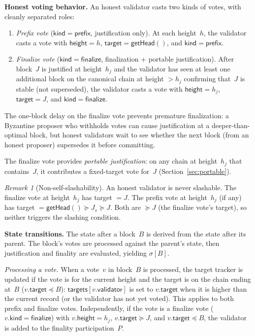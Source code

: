 \documentclass{article}
\renewcommand{\paragraph}[1]{\vspace{7pt}\noindent\textbf{#1}}
\newcommand{\target}{\mathsf{target}}
\newcommand{\targets}{\mathsf{targets}}
\newcommand{\kind}{\mathsf{kind}}
\newcommand{\height}{\mathsf{height}}
\newcommand{\finalize}{\mathsf{finalize}}
\newcommand{\validator}{\mathsf{validator}}
\newcommand{\prefix}{\mathsf{prefix}}
\theoremstyle{plain}
\theoremstyle{definition}
\theoremstyle{remark}
\newtheorem{remark}[theorem]{Remark}
\begin{document}
\paragraph{Honest voting behavior.}
An honest validator casts two kinds of votes, with cleanly separated roles:
\begin{enumerate}
  \item \emph{Prefix vote} ($\kind = \prefix$, justification only).
        At each height~$h$, the validator casts a vote with $\height = h$, $\target = \textsf{getHead}()$, and $\kind = \prefix$.
  \item \emph{Finalize vote} ($\kind = \finalize$, finalization + portable justification).
        After block~$J$ is justified at height~$h_j$ and the validator has seen at least one additional block on the canonical chain at height $> h_j$ confirming that~$J$ is stable (not superseded), the validator casts a vote with $\height = h_j$, $\target = J$, and $\kind = \finalize$.
\end{enumerate}
The one-block delay on the finalize vote prevents premature finalization: a Byzantine proposer who withholds votes can cause justification at a deeper-than-optimal block, but honest validators wait to see whether the next block (from an honest proposer) supersedes it before committing.

The finalize vote provides \emph{portable justification}: on any chain at height~$h_j$ that contains~$J$, it contributes a fixed-target vote for~$J$ (Section~\ref{sec:portable}).

\begin{remark}[Non-self-slashability]\label{rem:nonslash}
An honest validator is never slashable.
The finalize vote at height~$h_j$ has target $= J$.
The prefix vote at height~$h_j$ (if any) has target $= \textsf{getHead}() \succeq J_s \succeq J$.
Both are $\succeq J$ (the finalize vote's target), so neither triggers the slashing condition.
\end{remark}

\paragraph{State transitions.}
The state after a block~$B$ is derived from the state after its parent.
The block's votes are processed against the parent's state, then justification and finality are evaluated, yielding $\sigma[B]$.

\emph{Processing a vote.}
When a vote~$v$ in block~$B$ is processed, the target tracker is updated if the vote is for the current height and the target is on the chain ending at~$B$ ($v.\target \preceq B$): $\targets[v.\validator]$ is set to $v.\target$ when it is higher than the current record (or the validator has not yet voted).
This applies to both prefix and finalize votes.
Independently, if the vote is a finalize vote ($v.\kind = \finalize$) with $v.\height = h_j$, $v.\target \succeq J$, and $v.\target \preceq B$, the validator is added to the finality participation~$P$.
\end{document}
